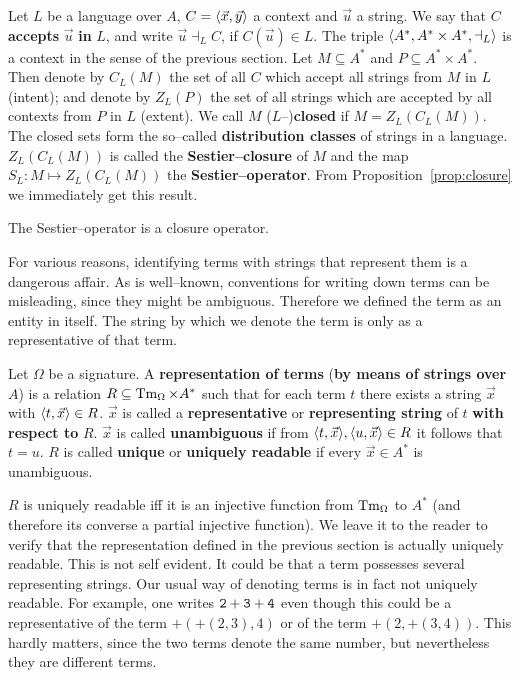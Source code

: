 Let $L$ be a language over $A$, $C = \langle \vec{x}, \vec{y}\rangle$
a context and $\vec{u}$ a string. We say that $C$ \textbf{accepts}
$\vec{u}$ \textbf{in} $L$, and write $\vec{u} \dashv_L C$, if 
$C(\vec{u}) \in L$. The triple 
$\langle A^{\ast}, A^{\ast} \times A^{\ast}, \dashv_L\rangle$
is a context in the sense of the previous section. Let $M \subseteq
A^{\ast}$ and $P \subseteq A^{\ast} \times A^{\ast}$. Then denote
by $C_L(M)$ the set of all $C$ which accept all strings from $M$
in $L$ (intent); and denote by $Z_L(P)$ the set of all strings which
are accepted by all contexts from $P$ in $L$ (extent).
%
\nocite{sestier:contributions}%
We call $M$ ($L$--)\textbf{closed} if $M = Z_L(C_L(M))$.
The closed sets form the so--called \textbf{distribution classes}
of strings in a language.
$Z_L(C_L(M))$ is called the \textbf{Sestier--closure} of $M$ and the map
$S_L \colon M \mapsto Z_L(C_L(M))$ the \textbf{Sestier--operator}. From
Proposition~\ref{prop:closure} we immediately get this result.
\begin{prop}
The Sestier--operator is a closure operator.
\end{prop}

For various reasons, identifying terms with strings that
represent them is a dangerous affair. As is well--known,
conventions for writing down terms can be misleading, since 
they might be ambiguous. Therefore we defined the term as an
entity in itself. The string by which we denote the term is 
only as a representative of that term.
\begin{defn}
Let $\Omega$ be a signature. A \textbf{representation of
terms} (\textbf{by means of strings over} $A$) is a relation
$R \subseteq \operatorname{Tm}_{\Omega} \times A^{\ast}$ such that
for each term $t$ there exists a string $\vec{x}$ with
$\langle t, \vec{x}\rangle \in R$. $\vec{x}$ is called a
\textbf{representative} or \textbf{representing string}
of $t$ \textbf{with respect to} $R$. $\vec{x}$ is called 
\textbf{unambiguous} if from $\langle t, \vec{x}\rangle, \langle u, 
\vec{x}\rangle \in R$ it follows that $t = u$. $R$ is called 
\textbf{unique} or \textbf{uniquely readable} if every 
$\vec{x} \in A^{\ast}$ is unambiguous.
\end{defn}
$R$ is uniquely readable iff it is an injective function
from $\operatorname{Tm}_{\Omega}$ to $A^{\ast}$ (and therefore its
converse a partial injective function).  We leave it to the reader
to verify that the representation defined in the previous section
is actually uniquely readable. This is not self evident. It could be
that a term possesses several representing strings. Our usual way of
denoting terms is in fact not uniquely readable.  For example, one 
writes ${\tt 2+3+4}$ even though this could be a representative of the 
term $+(+(2,3),4)$ or of the term $+(2,+(3,4))$. This hardly matters, 
since the two terms denote the same number, but nevertheless they are 
different terms.

